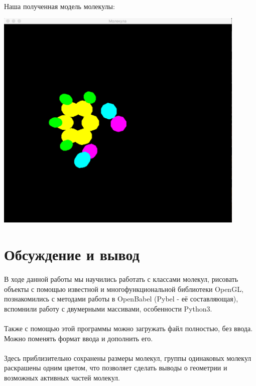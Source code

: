 \documentclass[a4paper,12pt]{article}
\begin{document}
\paragraph{} Наша полученная модель молекулы:
\begin{center}
    \includegraphics[width=0.9\textwidth]{molecule.png}\par\vspace{1 cm}
\end{center} 

\section{Обсуждение и вывод}
\paragraph{} В ходе данной работы мы научились работать с классами молекул, рисовать объекты с помощью известной и многофункциональной библиотеки OpenGL, познакомились с методами работы в OpenBabel (Pybel - её составляющая), вспомнили работу с двумерными массивами, особенности Python3. 
\paragraph{} Также с помощью этой программы можно загружать файл полностью, без ввода. Можно поменять формат ввода и дополнить его.
\paragraph{} Здесь приблизительно сохранены размеры молекул, группы одинаковых молекул раскрашены одним цветом, что позволяет сделать выводы о геометрии и возможных активных частей молекул. 
\end{document}
